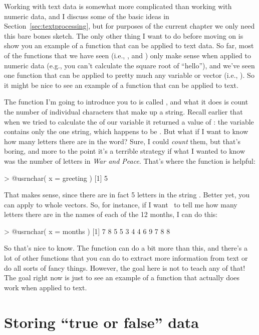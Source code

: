 
Working with text data is somewhat more complicated than working with numeric data, and I discuss some of the basic ideas in Section~\ref{sec:textprocessing}, but for purposes of the current chapter we only need this bare bones sketch. The only other thing I want to do before moving on is show you an example of a function that can be applied to text data. So far, most of the functions that we have seen (i.e., ,  and ) only make sense when applied to numeric data (e.g., you can't calculate the square root of ``hello''), and we've seen one function that can be applied to pretty much any variable or vector (i.e., ). So it might be nice to see an example of a function that can be applied to text. 

The function I'm going to introduce you to is called , and what it does is count the number of individual characters that make up a string. Recall earlier that when we tried to calculate the  of our  variable it returned a value of : the  variable contains only the one string, which happens to be . But what if I want to know how many letters there are in the word? Sure, I could {\it count} them, but that's boring, and more to the point it's a terrible strategy if what I wanted to know was the number of letters in {\it War and Peace}. That's where the  function is helpful:
\begin{rblock1}
> @usr{nchar( x = greeting )}
[1] 5
\end{rblock1}
That makes sense, since there are in fact 5 letters in the string . Better yet, you can apply  to whole vectors. So, for instance, if I want \R\ to tell me how many letters there are in the names of each of the 12 months, I can do this:
\begin{rblock1}
> @usr{nchar( x = months )}
 [1] 7 8 5 5 3 4 4 6 9 7 8 8
\end{rblock1}
So that's nice to know. The  function can do a bit more than this, and there's a lot of other functions that you can do to extract more information from text or do all sorts of fancy things. However, the goal here is not to teach any of that! The goal right now is just to see an example of a function that actually does work when applied to text. 


\section{Storing ``true or false'' data\label{sec:logicals}}

